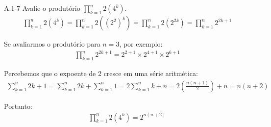 
\noindent A.1-7 Avalie o produtório $\prod_{k=1}^n 2(4^k)$.\\[6pt]
\begin{align*}
\prod_{k=1}^n 2(4^k) = \prod_{k=1}^n 2({(2^2)}^k) = \prod_{k=1}^n 2(2^{2k}) = \prod_{k=1}^n 2^{2k + 1}
\end{align*}

Se avaliarmos o produtório para $n = 3$, por exemplo:
\begin{align*}
\prod_{k=1}^n 2^{2k + 1} = 2^{2 + 1} \times 2^{4 + 1} \times 2^{6 + 1}
\end{align*}

Percebemos que o expoente de 2 cresce em uma série aritmética:
\begin{align*}
\sum_{k=1}^n 2k + 1 = \sum_{k=1}^n 2k + \sum_{k=1}^n 1 = 2\sum_{k=1}^n k + n =
2(\frac{n(n + 1)}{2}) + n = n(n + 2)
\end{align*}

Portanto:
\begin{align*}
\prod_{k=1}^n 2(4^k) = 2^{n(n + 2)}
\end{align*}